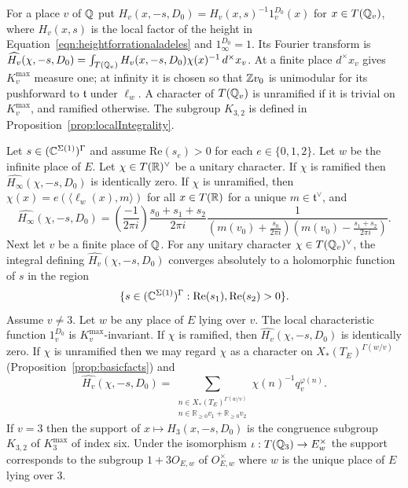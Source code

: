 \begin{proposition}

\label{prop:heightFourierTransform}


\leanok

For a place $v$ of $\mathbb{Q}$ put $H_v(x,-s,D_0)=H_v(x,s)^{-1}1_v^{D_0}(x)$ for $x\in T(\mathbb{Q}_v)$, where $H_v(x,s)$ is the local factor of the height in Equation~\ref{eqn:heightforrationaladeles} and $1_\infty^{D_0}=1$. Its Fourier transform is $\widehat{H_v}(\chi,-s,D_0)=\int_{T(\mathbb{Q}_v)}H_v(x,-s,D_0)\chi(x)^{-1}\,d^\times x_v$. At a finite place $d^\times x_v$ gives $K_v^{\mathrm{max}}$ measure one; at infinity it is chosen so that $\mathbb{Z} v_0$ is unimodular for its pushforward to $\mathfrak t$ under $\ell_w$. A character of $T(\mathbb{Q}_v)$ is unramified if it is trivial on $K_v^{\mathrm{max}}$, and ramified otherwise. The subgroup $K_{3,2}$ is defined in Proposition~\ref{prop:localIntegrality}.

 Let $s \in (\mathbb{C}^{\Sigma(1)})^{\Gamma}$ and assume $\mathrm{Re}(s_e)>0$ for each $e \in\{0,1,2\}$. Let $w$ be the infinite place of $E$. Let $\chi\in T(\mathbb{R})^\vee$ be a unitary character. If $\chi$ is ramified then $\widehat{H_\infty}(\chi,-s,D_0)$ is identically zero. If $\chi$ is unramified, then $\chi(x)= e(\langle \ell_w(x) ,m\rangle)$ for all $x \in T(\mathbb{R})$ for a unique $m \in \mathfrak t^\vee$, and \begin{equation*} \widehat{H_\infty}(\chi,-s,D_0) = \left(\frac{-1}{2\pi i}\right) \frac{s_0+s_1+s_2}{2\pi i} \frac{1}{(m(v_0)+\frac{s_0}{2\pi i})(m(v_0)-\frac{s_1+s_2}{2\pi i})}. \end{equation*} Next let $v$ be a finite place of $\mathbb{Q}$. For any unitary character $\chi\in T(\mathbb{Q}_v)^\vee$, the integral defining $\widehat{H_v}(\chi,-s,D_0)$ converges absolutely to a holomorphic function of $s$ in the region $$\{s \in (\mathbb{C}^{\Sigma(1)})^\Gamma : \mathrm{Re}(s_1),\mathrm{Re}(s_2)>0 \}.$$ Assume $v \neq 3$. Let $w$ be any place of $E$ lying over $v$. The local characteristic function $1_v^{D_0}$ is $K_v^{\mathrm{max}}$-invariant. If $\chi$ is ramified, then $\widehat{H_v}(\chi,-s,D_0)$ is identically zero. If $\chi$ is unramified then we may regard $\chi$ as a character on $X_\ast(T_{E})^{\Gamma(w/v)}$ (Proposition~\ref{prop:basicfacts}) and \begin{equation*} \widehat{H_v}(\chi,-s,D_0) = \sum_{\substack{n \in X_\ast(T_{E})^{\Gamma(w/v)}\\ n \in \mathbb R_{\geq 0}v_1+\mathbb R_{\geq 0}v_2} } \chi(n)^{-1} q_v^{\varphi(n)} . \end{equation*} If $v = 3$ then the support of $x \mapsto H_3(x,-s,D_0)$ is the congruence subgroup $K_{3,2}$ of $K_3^{\mathrm{max}}$ of index six. Under the isomorphism $\iota:T(\mathbb{Q}_3)\to E_w^\times$ the support corresponds to the subgroup $1+3O_{E,w}$ of $O_{E,w}^\times$ where $w$ is the unique place of $E$ lying over $3$. 

\end{proposition}

